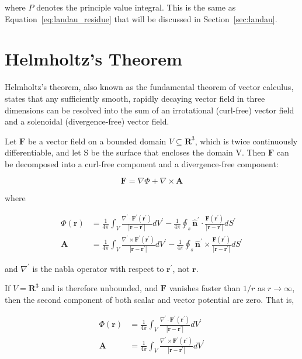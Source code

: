 \documentclass[
  notoc %
]{tufte-book}
\begin{document}
where \(P\) denotes the principle value integral. This is the same as
Equation~\ref{eq:landau_residue} that will be discussed in
Section~\ref{sec:landau}.

\hypertarget{helmholtzs-theorem}{%
\section{Helmholtz's Theorem}\label{helmholtzs-theorem}}

Helmholtz's theorem, also known as the fundamental theorem of vector
calculus, states that any sufficiently smooth, rapidly decaying vector
field in three dimensions can be resolved into the sum of an
irrotational (curl-free) vector field and a solenoidal (divergence-free)
vector field.

Let \(\mathbf{F}\) be a vector field on a bounded domain
\(V \subseteq \mathbf{R}^3\), which is twice continuously
differentiable, and let S be the surface that encloses the domain V.
Then \(\mathbf{F}\) can be decomposed into a curl-free component and a
divergence-free component:

\[
\mathbf{F}=\nabla \Phi +\nabla\times\mathbf{A}
\]

where

\[
\begin{aligned}
\Phi(\mathbf{r})&= \frac{1}{4\pi}\int_V\frac{\nabla^\prime\cdot\mathbf{F}^\prime(\mathbf{r}^\prime)}{|\mathbf{r}-\mathbf{r}^\prime|}dV^\prime -\frac{1}{4\pi}\oint_s \widehat{\mathbf{n}}^\prime\cdot\frac{\mathbf{F}(\mathbf{r}^\prime)}{|\mathbf{r}-\mathbf{r}^\prime|}dS^\prime \\
\mathbf{A} &= \frac{1}{4\pi}\int_V\frac{\nabla^\prime\times \mathbf{F}^\prime(\mathbf{r}^\prime)}{|\mathbf{r}-\mathbf{r}^\prime|}dV^\prime -\frac{1}{4\pi}\oint_s \widehat{\mathbf{n}}^\prime\times\frac{\mathbf{F}(\mathbf{r}^\prime)}{|\mathbf{r}-\mathbf{r}^\prime|}dS^\prime
\end{aligned}
\]

and \(\nabla^\prime\) is the nabla operator with respect to
\(\mathbf{r}^\prime\), not \(\mathbf{r}\).

If \(V = \mathbf{R}^3\) and is therefore unbounded, and \(\mathbf{F}\)
vanishes faster than \(1/r\) as \(r\rightarrow\infty\), then the second
component of both scalar and vector potential are zero. That is,

\[
\begin{aligned}
\Phi(\mathbf{r})&= \frac{1}{4\pi}\int_V\frac{\nabla^\prime\cdot\mathbf{F}^\prime(\mathbf{r}^\prime)}{|\mathbf{r}-\mathbf{r}^\prime|}dV^\prime  \\
\mathbf{A} &= \frac{1}{4\pi}\int_V\frac{\nabla^\prime\times \mathbf{F}^\prime(\mathbf{r}^\prime)}{|\mathbf{r}-\mathbf{r}^\prime|}dV^\prime
\end{aligned}
\]
\end{document}
